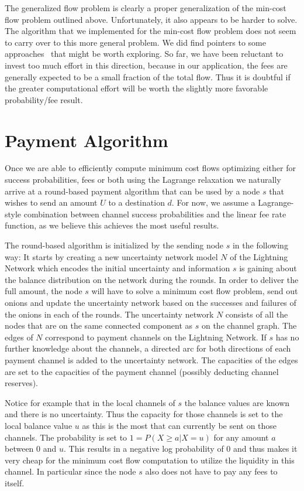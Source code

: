 \documentclass[10pt,twocolumn]{article}
\begin{document}
The generalized flow problem is clearly a proper generalization of the min-cost flow problem outlined above. Unfortunately, it also appears to be harder to solve. The algorithm that we implemented for the min-cost flow problem does not seem to carry over to this more general problem. We did find pointers to some approaches~\cite{tsengbertsekas} that might be worth exploring. So far, we have been reluctant to invest too much effort in this direction, because in our application, the fees are generally expected to be a small fraction of the total flow.  Thus it is doubtful if the greater computational effort will be worth the slightly more favorable probability/fee result.


\section{Payment Algorithm}
\label{rounds}
Once we are able to efficiently compute minimum cost flows optimizing either for success probabilities, fees or both using the Lagrange relaxation we naturally arrive at a round-based payment algorithm that can be used by a node $s$ that wishes to send an amount $U$ to a destination $d$.
For now, we assume a Lagrange-style combination between channel success probabilities and the linear fee rate function, as we believe this achieves the most useful results.

The round-based algorithm is initialized by the sending node $s$ in the following way:
It starts by creating a new uncertainty network model $N$ of the Lightning Network which encodes the initial uncertainty and information $s$ is gaining about the balance distribution on the network during the rounds.
In order to deliver the full amount, the node $s$ will have to solve a minimum cost flow problem, send out onions and update the uncertainty network based on the successes and failures of the onions in each of the rounds.
The uncertainty network $N$ consists of all the nodes that are on the same connected component as $s$ on the channel graph.
The edges of $N$ correspond to payment channels on the Lightning Network.
If $s$ has no further knowledge about the channels, a directed arc for both directions of each payment channel is added to the uncertainty network.
The capacities of the edges are set to the capacities of the payment channel (possibly deducting channel reserves).

Notice for example that in the local channels of $s$ the balance values are known and there is no uncertainty.
Thus the capacity for those channels is set to the local balance value $u$ as this is the most that can currently be sent on those channels.
The probability is set to $1 = P(X\geq a | X=u)$ for any amount $a$ between $0$ and $u$.
This results in a negative log probability of $0$ and thus makes it very cheap for the minimum cost flow computation to utilize the liquidity in this channel. In particular since the node $s$ also does not have to pay any fees to itself.
\end{document}
